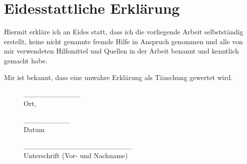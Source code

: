 \chapter{Eidesstattliche Erklärung}\label{chap.Ehrenwort}

Hiermit erkläre ich an Eides statt, dass ich die vorliegende Arbeit selbstständig erstellt, keine nicht genannte fremde Hilfe in Anspruch genommen und alle von mir verwendeten Hilfsmittel und Quellen in der Arbeit benannt und kenntlich gemacht habe.

Mir ist bekannt, dass eine unwahre Erklärung als Täuschung gewertet
wird.\\

\begin{figure}[H]
\begin{minipage}[hbt]{0.24\textwidth}
\flushleft
\normalsize
\vspace{1cm}
\_\_\_\_\_\_\_\_\_\_\_\\
Ort,\\
\end{minipage}
\begin{minipage}[hbt]{0.20\textwidth}
\flushleft
\normalsize
\vspace{1cm}
\_\_\_\_\_\_\_\_\_\\
Datum\\
\end{minipage}
\hfill
\begin{minipage}[hbt]{0.5\textwidth}
\flushleft
\normalsize
\vspace{1cm}
\_\_\_\_\_\_\_\_\_\_\_\_\_\_\_\_\_\_\_\_\_\\
Unterschrift (Vor- und Nachname)\\
\end{minipage}
\end{figure}
